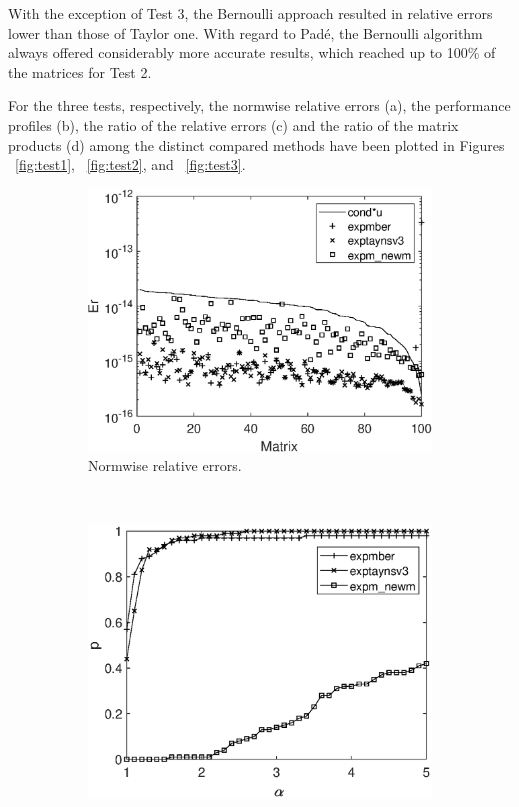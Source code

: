 With the exception of Test 3, the Bernoulli approach resulted in relative errors lower than those of Taylor one. With regard to Pad\'e, the Bernoulli algorithm always offered considerably more accurate results, which reached up to 100\% of the matrices for Test 2.

For the three tests, respectively, the normwise relative errors (a), the performance profiles (b), the ratio of the relative errors (c) and the ratio of the matrix products (d) among the distinct compared methods have been plotted in Figures ~\ref{fig:test1}, ~\ref{fig:test2}, and ~\ref{fig:test3}.

\begin{figure}[t]
\centering
\begin{subfigure}[b]{0.48\textwidth}
\includegraphics[scale=0.4]{Figures/normwise_exp_diag_hadamard_complex_n128_nd256_expmber.eps}
\caption{\footnotesize Normwise relative errors.} \label{fig:test1_a} \vspace{12pt}
\end{subfigure} \ \
\begin{subfigure}[b]{0.48\textwidth}
\includegraphics[scale=0.4]{Figures/nprofile_exp_diag_hadamard_complex_n128_nd256_expmber.eps}

\end{subfigure}
\end{figure}
